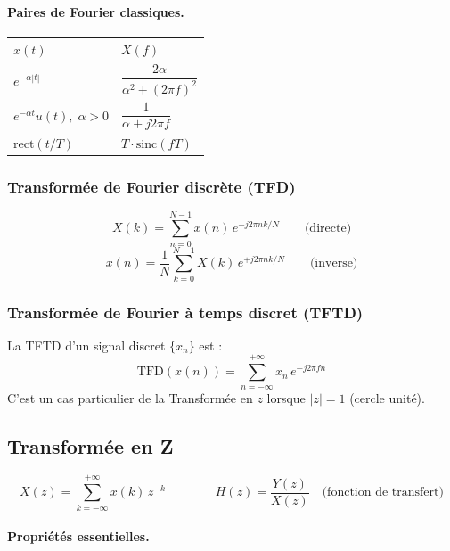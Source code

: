 \documentclass[12pt,a4paper]{article}
\newcommand{\TFD}{\mathrm{TFD}}
\newcommand{\rect}{\mathrm{rect}}
\newcommand{\sinc}{\mathrm{sinc}}
\begin{document}
\paragraph{Paires de Fourier classiques.}

\begin{center}
\renewcommand{\arraystretch}{1.5}
\begin{tabular}{@{}ll@{}}
\toprule
$x(t)$ & $X(f)$ \\
\midrule
$e^{-\alpha|t|}$ & $\dfrac{2\alpha}{\alpha^2 + (2\pi f)^2}$ \\[0.5em]
$e^{-\alpha t}u(t),\; \alpha>0$ & $\dfrac{1}{\alpha + j2\pi f}$ \\[0.5em]
$\rect(t/T)$ & $T\cdot\sinc(fT)$ \\
\bottomrule
\end{tabular}
\end{center}

\subsubsection{Transformée de Fourier discrète (TFD)}

\begin{tcolorbox}[formbox, title=TFD]
\[
  X(k) = \sum_{n=0}^{N-1} x(n)\,e^{-j2\pi nk/N}
  \qquad\text{(directe)}
\]
\[
  x(n) = \frac{1}{N}\sum_{k=0}^{N-1} X(k)\,e^{+j2\pi nk/N}
  \qquad\text{(inverse)}
\]
\end{tcolorbox}

\subsubsection{Transformée de Fourier à temps discret (TFTD)}

La TFTD d'un signal discret $\{x_n\}$ est :
\[
  \TFD(x(n)) = \sum_{n=-\infty}^{+\infty} x_n\,e^{-j2\pi fn}
\]
C'est un cas particulier de la Transformée en $z$ lorsque $|z|=1$ (cercle unité).

\subsection{Transformée en Z}

\begin{tcolorbox}[formbox, title=Transformée en Z]
\[
  X(z) = \sum_{k=-\infty}^{+\infty} x(k)\,z^{-k}
  \qquad\qquad
  H(z) = \frac{Y(z)}{X(z)} \quad \text{(fonction de transfert)}
\]
\end{tcolorbox}

\paragraph{Propriétés essentielles.}
\end{document}
